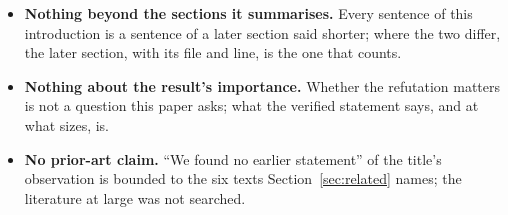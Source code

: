 \begin{itemize}
\item \textbf{Nothing beyond the sections it summarises.} Every
  sentence of this introduction is a sentence of a later section said
  shorter; where the two differ, the later section, with its file and
  line, is the one that counts.
\item \textbf{Nothing about the result's importance.} Whether the
  refutation matters is not a question this paper asks; what the
  verified statement says, and at what sizes, is.
\item \textbf{No prior-art claim.} ``We found no earlier statement'' of
  the title's observation is bounded to the six texts
  Section~\ref{sec:related} names; the literature at large was not
  searched.
\end{itemize}
